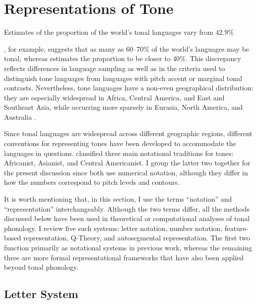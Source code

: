 \section{Representations of Tone}

Estimates of the proportion of the world's tonal languages vary 
from 42.9\% 

\citet{yip2002tone}, for example, suggests that as many as 60--70\% of the world's 
languages may be tonal, whereas \citet{maddieson2013tone} estimates the proportion 
to be closer to 40\%. This discrepancy reflects differences in language sampling as 
well as in the criteria used to distinguish tone languages from languages with pitch 
accent or marginal tonal contrasts. Nevertheless, tone languages have a non-even 
geographical distribution: they are especially widespread in Africa, Central America, 
and East and Southeast Asia, while occurring more sparsely in Eurasia, North America, 
and Australia 
\citep{welmers1962, maddieson2013tone, kao2017phonological, 
	gordon2016phonological}.

Since tonal languages are widespread across different 
geographic regions, different conventions for representing 
tones have been developed to accommodate the languages in 
questions. \citet{yip2002tone} classified three main notational traditions 
for tones: Africanist, Asianist, and Central Americanist.
I group the latter two together for the present discussion since 
both use numerical notation, although they differ in how the numbers 
correspond to pitch levels and contours. 

It is worth mentioning that, in this section, I use the terms ``notation'' and 
``representation'' interchangeably. Although the two terms differ, all the methods 
discussed below have been used in theoretical or computational analyses of tonal 
phonology. I review five such systems: letter notation, number notation, feature-based 
representation, Q-Theory, and autosegmental representation. The first two function 
primarily as notational systems in previous work, whereas the remaining three are more 
formal representational frameworks that have also been applied beyond tonal phonology.

\subsection{Letter System}

